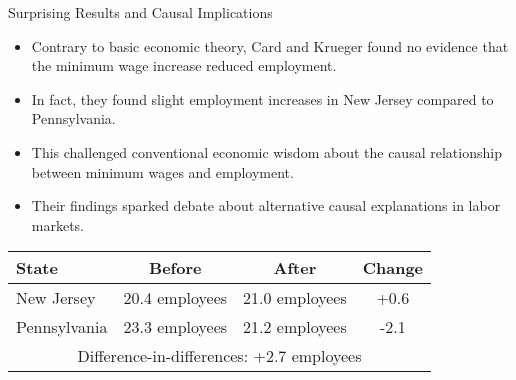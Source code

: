 \documentclass{beamer}
\begin{document}
\begin{frame}{Surprising Results and Causal Implications}
    \begin{itemize}
        \item Contrary to basic economic theory, Card and Krueger found no evidence that the minimum wage increase reduced employment.
        \item In fact, they found slight employment increases in New Jersey compared to Pennsylvania.
        \item This challenged conventional economic wisdom about the causal relationship between minimum wages and employment.
        \item Their findings sparked debate about alternative causal explanations in labor markets.
    \end{itemize}
    
    \begin{table}
        \centering
        \begin{tabular}{|l|c|c|c|}
            \hline
            \textbf{State} & \textbf{Before} & \textbf{After} & \textbf{Change} \\
            \hline
            New Jersey & 20.4 employees & 21.0 employees & +0.6 \\
            \hline
            Pennsylvania & 23.3 employees & 21.2 employees & -2.1 \\
            \hline
            \multicolumn{4}{|c|}{Difference-in-differences: +2.7 employees} \\
            \hline
        \end{tabular}
    \end{table}
\end{frame}
\end{document}
